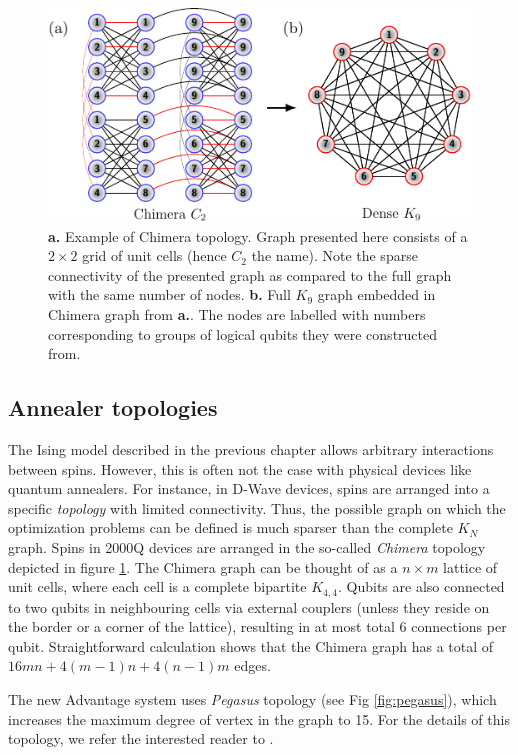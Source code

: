 \begin{figure}[h]
    \centering
    \includegraphics[width=\textwidth]{figures/chimera.pdf}
    \caption{\textbf{a.} Example of Chimera topology. Graph presented here consists of a $2 \times 2$ grid of unit cells (hence $C_2$ the name). Note the sparse connectivity of the presented graph as compared to the full graph with the same number of nodes. \textbf{b.} Full $K_9$ graph embedded in Chimera graph from \textbf{a.}. The nodes are labelled with numbers corresponding to groups of logical qubits they were constructed from.}
    \label{fig:chimera}
\end{figure}


\subsection{Annealer topologies}

The Ising model described in the previous chapter allows arbitrary interactions between spins. However, this is often not the case with physical devices like quantum annealers. For instance, in D-Wave devices, spins are arranged into a specific \emph{topology} with limited connectivity. Thus, the possible graph on which the optimization problems can be defined is much sparser than the complete $K_{N}$ graph. Spins in 2000Q devices are arranged in the so-called \emph{Chimera} topology depicted in figure \ref{fig:chimera}. The Chimera graph can be thought of as a $n \times m$ lattice of unit cells, where each cell is a complete bipartite $K_{4,4}$. Qubits are also connected to two qubits in neighbouring cells via external couplers (unless they reside on the border or a corner of the lattice), resulting in at most total 6 connections per qubit. Straightforward calculation shows that the Chimera graph has a total of $16mn + 4(m-1)n + 4(n-1)m$ edges.

The new Advantage system uses \emph{Pegasus} topology (see Fig \ref{fig:pegasus}), which increases
the maximum degree of vertex in the graph to 15. For the details of this topology, we refer the interested
reader to \cite{boothby}.


